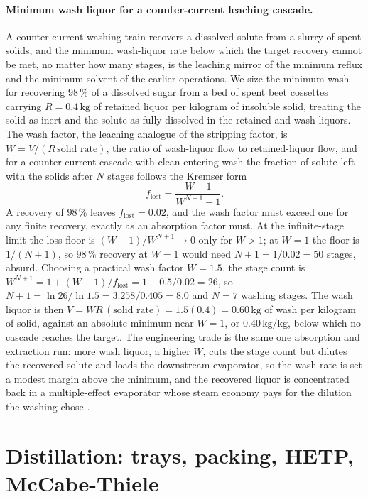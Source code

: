 \paragraph{Minimum wash liquor for a counter-current leaching cascade.} A
counter-current washing train recovers a dissolved solute from a slurry of
spent solids, and the minimum wash-liquor rate below which the target recovery
cannot be met, no matter how many stages, is the leaching mirror of the minimum
reflux and the minimum solvent of the earlier operations. We size the minimum
wash for recovering $98\,\%$ of a dissolved sugar from a bed of spent beet cossettes
carrying $R = 0.4\,\text{kg}$ of retained liquor per kilogram of insoluble
solid, treating the solid as inert and the solute as fully dissolved in the
retained and wash liquors. The wash factor, the leaching analogue of the
stripping factor, is $W = V/(R\,\text{solid rate})$, the ratio of wash-liquor
flow to retained-liquor flow, and for a counter-current cascade with clean
entering wash the fraction of solute left with the solids after $N$ stages
follows the Kremser form
\[
f_{\text{lost}} = \frac{W - 1}{W^{N+1} - 1}.
\]
A recovery of $98\,\%$ leaves $f_{\text{lost}} = 0.02$, and the wash factor
must exceed one for any finite recovery, exactly as an absorption factor must.
At the infinite-stage limit the loss floor is $(W-1)/W^{N+1}\to 0$ only for
$W > 1$; at $W = 1$ the floor is $1/(N+1)$, so $98\,\%$ recovery at $W = 1$
would need $N + 1 = 1/0.02 = 50$ stages, absurd. Choosing a practical wash
factor $W = 1.5$, the stage count is $W^{N+1} = 1 + (W-1)/f_{\text{lost}} =
1 + 0.5/0.02 = 26$, so $N + 1 = \ln 26/\ln 1.5 = 3.258/0.405 = 8.0$ and
$N = 7$ washing stages. The wash liquor is then $V = W R\,(\text{solid rate}) =
1.5(0.4) = 0.60\,\text{kg}$ of wash per kilogram of solid, against an absolute
minimum near $W = 1$, or $0.40\,\text{kg/kg}$, below which no cascade reaches
the target. The engineering trade is the same one absorption and extraction
run: more wash liquor, a higher $W$, cuts the stage count but dilutes the
recovered solute and loads the downstream evaporator, so the wash rate is set a
modest margin above the minimum, and the recovered liquor is concentrated back
in a multiple-effect evaporator whose steam economy pays for the dilution the
washing chose \cite{text:treybal-mass-transfer}.

\section{Distillation: trays, packing, HETP, McCabe-Thiele}

